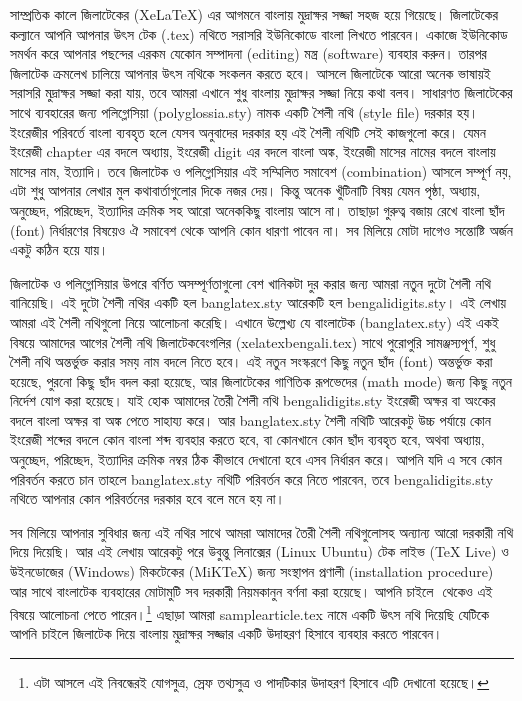 \documentclass[a4paper,10pt,xetex]{article}
\begin{document}
সাম্প্রতিক কালে জিলাটেকের (XeLaTeX) এর আগমনে বাংলায় মুদ্রাক্ষর সজ্জা সহজ হয়ে গিয়েছে। জিলাটেকের কল্যানে আপনি আপনার উৎস টেক (.tex) নথিতে সরাসরি ইউনিকোডে বাংলা লিখতে পারবেন। একাজে ইউনিকোড সমর্থন করে আপনার পছন্দের এরকম যেকোন সম্পাদনা (editing) মন্ত্র (software) ব্যবহার করুন। তারপর জিলাটেক ক্রমলেখ চালিয়ে আপনার উৎস নথিকে সংকলন করতে হবে। আসলে জিলাটেকে আরো অনেক ভাষায়ই সরাসরি মুদ্রাক্ষর সজ্জা করা  যায়, তবে আমরা এখানে শুধু বাংলায় মুদ্রাক্ষর সজ্জা নিয়ে কথা বলব। সাধারণত জিলাটেকের সাথে ব্যবহারের জন্য পলিগ্লোসিয়া (polyglossia.sty) নামক একটি শৈলী নথি (style file) দরকার হয়। ইংরেজীর পরিবর্তে বাংলা ব্যবহৃত হলে যেসব অনুবাদের দরকার হয় এই শৈলী নথিটি সেই কাজগুলো করে। যেমন ইংরেজী chapter এর বদলে অধ্যায়, ইংরেজী digit এর বদলে বাংলা অঙ্ক, ইংরেজী মাসের নামের বদলে বাংলায় মাসের নাম, ইত্যাদি। তবে জিলাটেক ও পলিগ্লোসিয়ার এই সম্মিলিত সমাবেশ (combination) আসলে সম্পূর্ণ নয়, এটা শুধু আপনার লেখার মুল কথাবার্তাগুলোর দিকে নজর দেয়। কিন্তু অনেক খুঁটিনাটি বিষয় যেমন পৃষ্ঠা, অধ্যায়, অনুচ্ছেদ, পরিচ্ছেদ, ইত্যাদির ক্রমিক সহ আরো অনেককিছু বাংলায় আসে না। তাছাড়া গুরুত্ব বজায় রেখে বাংলা ছাঁদ (font) নির্ধারণের বিষয়েও ঐ সমাবেশ থেকে আপনি কোন ধারণা পাবেন না। সব মিলিয়ে মোটা দাগেও সন্তোষ্টি অর্জন একটু কঠিন হয়ে যায়।  

জিলাটেক ও পলিগ্লোসিয়ার উপরে বর্ণিত অসম্পূর্ণতাগুলো বেশ খানিকটা দুর করার জন্য আমরা নতুন দুটো শৈলী নথি বানিয়েছি। এই দুটো শৈলী নথির একটি হল banglatex.sty আরেকটি হল bengalidigits.sty। এই লেখায় আমরা এই শৈলী নথিগুলো নিয়ে আলোচনা করেছি। এখানে উল্লেখ্য যে বাংলাটেক (banglatex.sty) এই একই বিষয়ে আমাদের আগের শৈলী নথি জিলাটেকবেংগলির (xelatexbengali.tex) সাথে পুরোপুরি সামঞ্জস্যপূর্ণ, শুধু শৈলী নথি অন্তর্ভুক্ত করার সময় নাম বদলে নিতে হবে। এই নতুন সংস্করণে কিছু নতুন ছাঁদ (font) অন্তর্ভুক্ত করা হয়েছে, পুরনো কিছু ছাঁদ বদল করা হয়েছে, আর জিলাটেকের গাণিতিক রূপভেদের (math mode) জন্য কিছু নতুন নির্দেশ যোগ করা হয়েছে। যাই হোক আমাদের তৈরী শৈলী নথি bengalidigits.sty ইংরেজী অক্ষর বা অংকের বদলে বাংলা অক্ষর বা অঙ্ক পেতে সাহায্য করে। আর banglatex.sty শৈলী নথিটি আরেকটু উচ্চ পর্যায়ে কোন ইংরেজী শব্দের বদলে কোন বাংলা শব্দ ব্যবহার করতে হবে, বা কোনখানে কোন ছাঁদ ব্যবহৃত হবে, অথবা অধ্যায়, অনুচ্ছেদ, পরিচ্ছেদ, ইত্যাদির ক্রমিক নম্বর ঠিক কীভাবে দেখানো হবে এসব নির্ধারন করে। আপনি যদি এ সবে কোন পরিবর্তন করতে চান তাহলে banglatex.sty নথিটি পরিবর্তন করে নিতে পারবেন, তবে bengalidigits.sty নথিতে আপনার কোন পরিবর্তনের দরকার হবে বলে মনে হয় না।  

সব মিলিয়ে আপনার সুবিধার জন্য এই নথির সাথে আমরা আমাদের তৈরী শৈলী নথিগুলোসহ অন্যান্য আরো দরকারী  নথি দিয়ে দিয়েছি। আর এই লেখায় আরেকটু পরে উবুন্তু লিনাক্সের (Linux Ubuntu) টেক লাইভ (TeX Live) ও উইনডোজের (Windows) মিকটেকের (MiKTeX) জন্য সংস্থাপন প্রণালী (installation procedure) আর সাথে বাংলাটেক ব্যবহারের মোটামুটি সব দরকারী নিয়মকানুন বর্ণনা করা হয়েছে। আপনি চাইলে ‌\cite{thisdoc} থেকেও এই বিষয়ে  আলোচনা পেতে পারেন।\footnote{এটা আসলে এই নিবন্ধেরই যোগসুত্র, স্রেফ তথ্যসুত্র ও পাদটিকার উদাহরণ হিসাবে এটি দেখানো হয়েছে।} এছাড়া আমরা samplearticle.tex নামে একটি উৎস নথি দিয়েছি যেটিকে আপনি চাইলে জিলাটেক দিয়ে বাংলায় মুদ্রাক্ষর সজ্জার একটি উদাহরণ হিসাবে ব্যবহার করতে পারবেন। 
\end{document}

